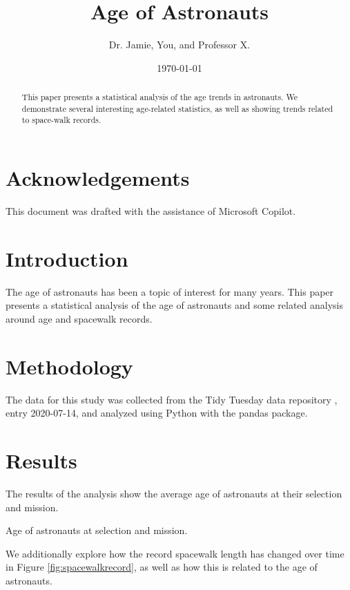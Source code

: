 \documentclass{article}
\title{Age of Astronauts}
\author{Dr. Jamie, You, and Professor X.}
\date{\today}
\begin{document}
\maketitle

\begin{abstract}
This paper presents a statistical analysis of the age trends in astronauts. 
We demonstrate several interesting age-related statistics, as well as showing trends related to space-walk records.
\end{abstract}

\section{Acknowledgements}
This document was drafted with the assistance of Microsoft Copilot.

\section{Introduction}
The age of astronauts has been a topic of interest for many years. 
This paper presents a statistical analysis of the age of astronauts and some related analysis around age and spacewalk records.

\section{Methodology}
The data for this study was collected from the Tidy Tuesday data repository \cite{tidytuesday}, entry 2020-07-14, and analyzed using Python with the pandas \cite{reback2020pandas,mckinney-proc-scipy-2010} package.

\section{Results}
The results of the analysis show the average age of astronauts at their selection and mission.

\begin{table}[h]
\centering

\caption{Age of astronauts at selection and mission.}
\label{tab:sample_table}
\end{table}

We additionally explore how the record spacewalk length has changed over time in Figure \ref{fig:spacewalkrecord}, as well as how this is related to the age of astronauts. 
\end{document}
